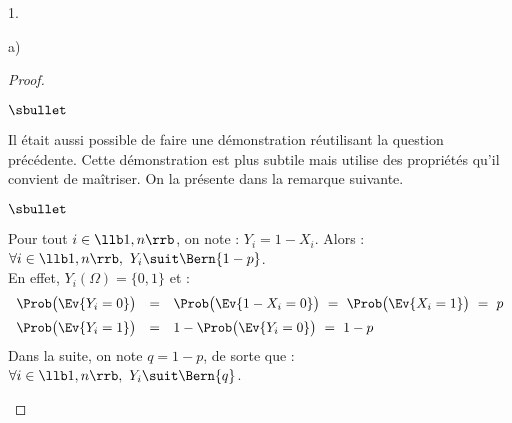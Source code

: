 \documentclass[11pt]{article}%
\begin{document}
\begin{noliste}{1.}
\begin{noliste}{a)}
\begin{proof}
\begin{remarkL}{.99}
\begin{noliste}{$\sbullet$}

        \item Il était aussi possible de faire une démonstration
          réutilisant la question précédente. Cette démonstration est
          plus subtile mais utilise des propriétés qu'il convient de
          maîtriser. On la présente dans la remarque suivante.
        \end{noliste}
      \end{remarkL}
      \begin{remarkL}{.99}
        \begin{noliste}{$\sbullet$}
        \item Pour tout $i \in \llb 1, n \rrb$, on note : $Y_i = 1 -
          X_i$. Alors : $\forall i \in \llb 1, n \rrb, \ Y_i \suit
          \Bern{1-p}$.\\[.1cm]
          En effet, $Y_i(\Omega) = \{0, 1\}$ et :
          \[
          \begin{array}{rcl}
            \Prob\big( \Ev{Y_i = 0} \big) & = & \Prob\big( \Ev{1 - X_i = 0}
            \big) \ = \ \Prob\big( \Ev{X_i = 1} \big) \ = \ p
            \\[.2cm]
            \Prob\big( \Ev{Y_i = 1} \big) & = & 1 - \Prob\big( \Ev{Y_i = 0}
            \big) \ = \ 1 - p
          \end{array}
          \]
          Dans la suite, on note $q = 1-p$, de sorte que : $\forall i
          \in \llb 1, n \rrb, \ Y_i \suit \Bern{q}$.


\end{noliste}
\end{remarkL}
\end{proof}
\end{noliste}
\end{noliste}
\end{document}
